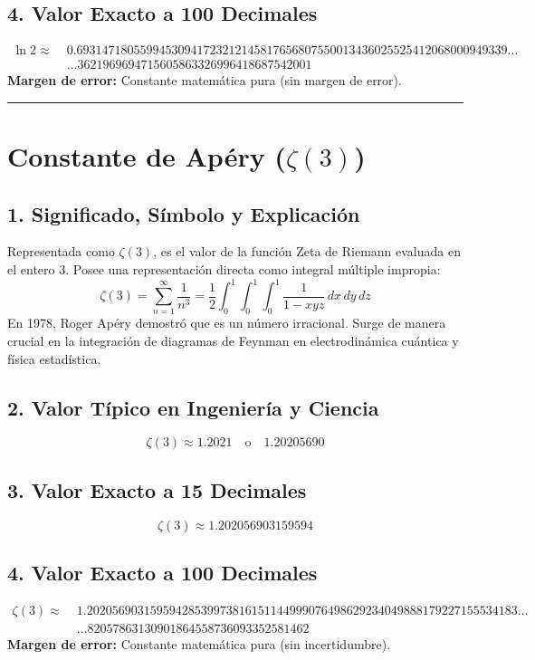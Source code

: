 \documentclass[12pt,a4paper]{article}
\begin{document}
\subsection*{4. Valor Exacto a 100 Decimales}
\begin{align*}
\ln 2 \approx \; & 0.69314718055994530941723212145817656807550013436025525412068000949339... \\
& ...3621969694715605863326996418687542001
\end{align*}
\textbf{Margen de error:} Constante matemática pura (sin margen de error).

\vspace{0.8cm}
\hrule
\vspace{0.8cm}

\section{Constante de Apéry ($\zeta(3)$)}

\subsection*{1. Significado, Símbolo y Explicación}
Representada como $\zeta(3)$, es el valor de la función Zeta de Riemann evaluada en el entero $3$. Posee una representación directa como integral múltiple impropia:
\begin{equation*}
\zeta(3) = \sum_{n=1}^{\infty} \frac{1}{n^3} = \frac{1}{2} \int_{0}^{1} \int_{0}^{1} \int_{0}^{1} \frac{1}{1 - xyz} \, dx \, dy \, dz
\end{equation*}
En 1978, Roger Apéry demostró que es un número irracional. Surge de manera crucial en la integración de diagramas de Feynman en electrodinámica cuántica y física estadística.

\subsection*{2. Valor Típico en Ingeniería y Ciencia}
\begin{equation*}
\zeta(3) \approx 1.2021 \quad \text{o} \quad 1.20205690
\end{equation*}

\subsection*{3. Valor Exacto a 15 Decimales}
\begin{equation*}
\zeta(3) \approx 1.202056903159594
\end{equation*}

\subsection*{4. Valor Exacto a 100 Decimales}
\begin{align*}
\zeta(3) \approx \; & 1.20205690315959428539973816151144999076498629234049888179227155534183... \\
& ...82057863130901864558736093352581462
\end{align*}
\textbf{Margen de error:} Constante matemática pura (sin incertidumbre).
\end{document}
